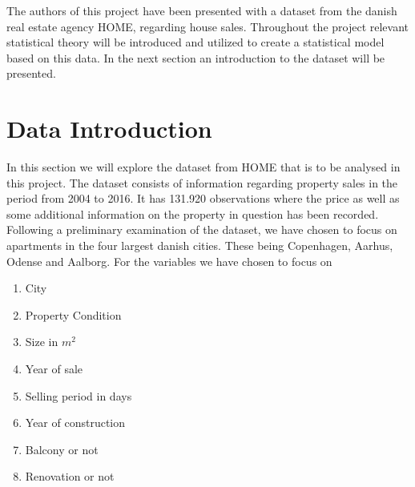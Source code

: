 The authors of this project have been presented with a dataset from the danish real estate agency HOME, regarding house sales.
Throughout the project relevant statistical theory will be introduced and utilized to create a statistical model based on this data.
In the next section an introduction to the dataset will be presented.

\section{Data Introduction}
In this section we will explore the dataset from HOME that is to be analysed in this project.
The dataset consists of information regarding property sales in the period from 2004 to 2016.
It has 131.920 observations where the price as well as some additional information on the property in question has been recorded.
Following a preliminary examination of the dataset, we have chosen to focus on apartments in the four largest danish cities. 
These being Copenhagen, Aarhus, Odense and Aalborg.
For the variables we have chosen to focus on
\begin{enumerate}
    \item City
    \item Property Condition
    \item Size in $m^2$
    \item Year of sale
    \item Selling period in days
    \item Year of construction
    \item Balcony or not
    \item Renovation or not
\end{enumerate}
